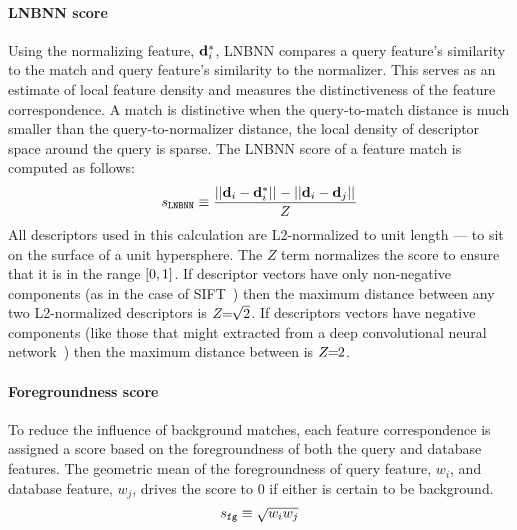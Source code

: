         \paragraph{LNBNN score}\label{sec:lnbnnscore}

            Using the normalizing feature, $\mathbf{d}^{*}_{i}$, LNBNN
              compares a query feature's similarity to the match and
              query feature's similarity to the normalizer.
            This serves as an estimate of local feature density and
              measures the distinctiveness of the feature correspondence.
            A match is distinctive when the query-to-match distance is
              much smaller than the query-to-normalizer distance, \ie{}
              the local density of descriptor space around the query is
              sparse.
            The LNBNN score of a feature match is computed as follows:
            \begin{equation}\label{eqn:lnbnn}
                s_{\tt{LNBNN}} \equiv \frac{||\mathbf{d}_i - \mathbf{d}^{*}_{i}||_{} - ||\mathbf{d}_i - \mathbf{d}_j||_{}}{Z}
            \end{equation}
            All descriptors used in this calculation are L2-normalized
              to unit length --- \ie{} to sit on the surface of a unit
              hypersphere.
            The $Z$ term normalizes the score to ensure that it is in
              the range $[0, 1]$.
            If descriptor vectors have only non-negative components (as
              in the case of SIFT~\cite{lowe_distinctive_2004}) then the
              maximum distance between any two L2-normalized descriptors
              is $Z\mkern-6mu=\mkern-6mu\sqrt{2}$.
            If descriptors vectors have negative components (like those
              that might extracted from a deep convolutional neural
              network~\cite{zagoruyko_learning_2015}) then the maximum
              distance between is $Z\mkern-6mu=\mkern-6mu2$.

        \paragraph{Foregroundness score}
            To reduce the influence of background matches, each feature
              correspondence is assigned a score based on the
              foregroundness of both the query and database features.
            The geometric mean of the foregroundness of query feature,
              $w_i$, and database feature, $w_j$, drives the score to $0$
              if either is certain to be background.
            \begin{equation}
                s_{{\tt fg}} \equiv \sqrt{w_i w_j}
            \end{equation}

